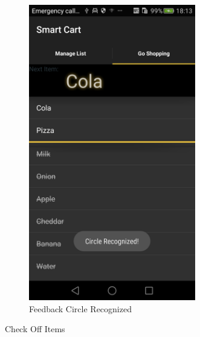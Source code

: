 \begin{figure}[h]
\begin{subfigure}{0.475\textwidth}
\includegraphics[width=0.8\textwidth, height=
0.35\textheight]{res/usermanual/circleRecognized.png}
\caption{Feedback Circle Recognized}
\label{fig:initial}
\end{subfigure}
\caption{Check Off Items}
\label{fig:checkItems}
\end{figure}


